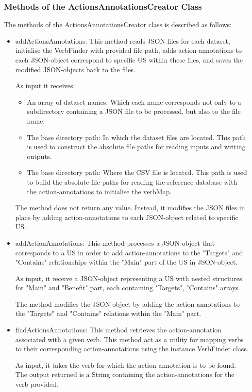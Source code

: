 \subsubsection*{Methods of the ActionsAnnotationsCreator Class}
The methods of the ActionsAnnotationsCreator class is described as follows:
\begin{itemize}	
	\item addActionsAnnotations: This method reads JSON files for each dataset, initialise the VerbFinder with provided file path, adds action-annotations to each JSON-object correspond to specific US within these files, and saves the modified JSON-objects back to the files.
	
	As input it receives:
	\begin{itemize}
		\item An array of dataset names: Which each name corresponds not only to a subdirectory containing a JSON file to be processed, but also to the file name.
		
		\item The base directory path: In which the dataset files are located. This path is used to construct the absolute file paths for reading inputs and writing outputs.
		
		\item The base directory path: Where the CSV file is located. This path is used to build the absolute file paths for reading the reference database with the action-annotations to initialise the verbMap.
	\end{itemize}
	
	The method does not return any value. Instead, it modifies the JSON files in place by adding action-annotations to each JSON-object related to specific US.
	
	\item addActionAnnotations: This method processes a JSON-object that corresponds to a US in order to add action-annotations to the "Targets" and "Contains" relationships within the "Main" part of the US in JSON-object.
	
	As input, it receive a JSON-object representing a US with nested structures for "Main" and "Benefit" part, each containing "Targets", "Contains" arrays.
	
	The method modifies the JSON-object by adding the action-annotations to the "Targets" and "Contains" relations within the "Main" part.
		
	\item findActionsAnnotations: This method retrieves the action-annotation associated with a given verb. This method act as a utility for mapping verbs to their corresponding action-annotations using the instance VerbFinder class.
	
	As input, it takes the verb for which the action-annotation is to be found. The output returned is a String containing the action-annotations for the verb provided.	
\end{itemize}

